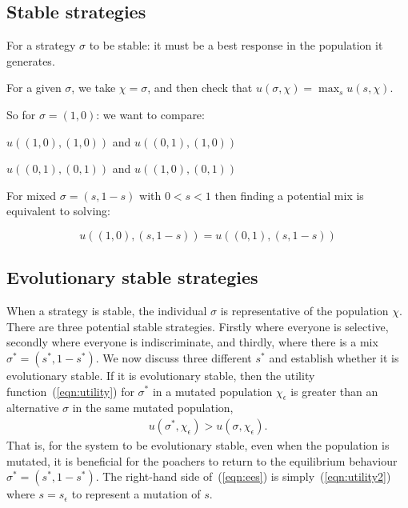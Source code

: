 \documentclass[10pt]{article}
\begin{document}
\subsection{Stable strategies}

For a strategy $\sigma$ to be stable: it must be a best response in the population it generates.

For a given $\sigma$, we take $\chi=\sigma$, and then check that $u(\sigma, \chi) = \max_{s}u(s, \chi)$.

So for $\sigma=(1,0)$: we want to compare:

$u((1, 0), (1, 0))$ and $u((0, 1), (1, 0))$

$u((0, 1), (0, 1))$ and $u((1, 0), (0, 1))$


For mixed $\sigma=(s, 1-s)$ with $0<s<1$ then finding a potential mix is equivalent to solving:

$$
u((1, 0), (s, 1 - s)) = u((0, 1), (s, 1 -s))
$$

\subsection{Evolutionary stable strategies}

When a strategy is stable, the individual $\sigma$ is representative of the population $\chi$. There are three potential stable strategies. Firstly where everyone is selective, secondly where everyone is indiscriminate, and thirdly, where there is a mix $\sigma^* = (s^*,1-s^*)$. We now discuss three different $s^*$ and establish whether it is evolutionary stable. If it is evolutionary stable, then the utility function~(\ref{eqn:utility}) for $\sigma^*$ in a mutated population $\chi_\epsilon$ is greater than an alternative $\sigma$ in the same mutated population,
\begin{eqnarray}
\label{eqn:ees}
u(\sigma^*,\chi_\epsilon) > u(\sigma,\chi_\epsilon).
\end{eqnarray}
That is, for the system to be evolutionary stable, even when the population is mutated, it is beneficial for the poachers to return to the equilibrium behaviour $\sigma^* = (s^*,1-s^*)$. The right-hand side of~(\ref{eqn:ees}) is simply~(\ref{eqn:utility2}) where $s=s_\epsilon$ to represent a mutation of $s$.
\end{document}
